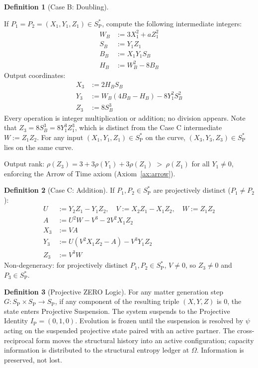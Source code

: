 \documentclass[11pt, letterpaper]{article}
\newcommand{\SP}{S_{\mathrm{P}}}
\newcommand{\SPs}{S_{\mathrm{P}}^{*}}
\newcommand{\IP}{I_{\mathrm{P}}}
\newcommand{\rank}{\rho}
\theoremstyle{definition}
\newtheorem{definition}{Definition}[section]
\theoremstyle{plain}
\begin{document}
\begin{definition}[Case B: Doubling]\label{def:caseB}
\begin{rsbox}
If $P_1=P_2=(X_1,Y_1,Z_1)\in\SPs$, compute the following intermediate
integers:
\begin{align*}
W_B &:= 3X_1^2 + a Z_1^2 \\
S_B &:= Y_1 Z_1 \\
B_B &:= X_1 Y_1 S_B \\
H_B &:= W_B^2 - 8B_B
\end{align*}
Output coordinates:
\begin{align*}
X_3 &:= 2 H_B S_B \\
Y_3 &:= W_B(4B_B - H_B) - 8Y_1^2 S_B^2 \\
Z_3 &:= 8 S_B^3
\end{align*}
Every operation is integer multiplication or addition; no division appears.
Note that $Z_3=8S_B^3=8Y_1^3Z_1^3$, which is distinct from the Case C
intermediate $W:=Z_1Z_2$.  For any input $(X_1,Y_1,Z_1)\in\SPs$ on the
curve, $(X_3,Y_3,Z_3)\in\SPs$ lies on the same curve.

Output rank: $\rank(Z_3)=3+3\rank(Y_1)+3\rank(Z_1)\;>\;\rank(Z_1)$ for all
$Y_1\neq 0$, enforcing the Arrow of Time axiom (Axiom~\ref{ax:arrow}).
\end{rsbox}
\end{definition}

\begin{definition}[Case C: Addition]\label{def:caseC}
If $P_1,P_2\in\SPs$ are projectively distinct ($P_1\neq P_2$):
\begin{align*}
U &:= Y_2 Z_1-Y_1 Z_2, \quad V := X_2 Z_1-X_1 Z_2, \quad W := Z_1 Z_2 \\
A &:= U^2 W-V^3-2V^2 X_1 Z_2 \\
X_3 &:= VA \\
Y_3 &:= U(V^2 X_1 Z_2-A)-V^3 Y_1 Z_2 \\
Z_3 &:= V^3 W
\end{align*}
Non-degeneracy: for projectively distinct $P_1,P_2\in\SPs$, $V\neq 0$,
so $Z_3\neq 0$ and $P_3\in\SPs$.
\end{definition}

\begin{definition}[Projective ZERO Logic]\label{def:proj-zero}
For any matter generation step $G:\SP\times\SP\to\SP$, if any component of
the resulting triple $(X,Y,Z)$ is $0$, the state enters
Projective Suspension.  The system suspends to the Projective
Identity $\IP=(0,1,0)$.  Evolution is frozen until the suspension is
resolved by $\psi$ acting on the suspended projective state paired with
an active partner.  The cross-reciprocal form moves the structural history
into an active configuration; capacity information is distributed to the
structural entropy ledger at $\Omega$.  Information is preserved, not lost.
\end{definition}
\end{document}
